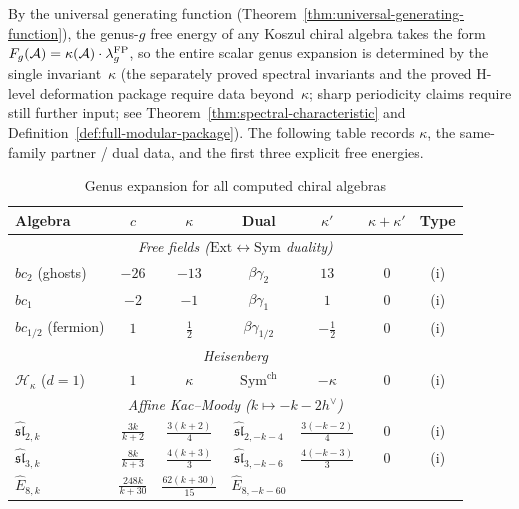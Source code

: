 By the universal generating function
(Theorem~\ref{thm:universal-generating-function}), the genus-$g$
free energy of any Koszul chiral algebra takes the form
$F_g(\mathcal{A}) = \kappa(\mathcal{A}) \cdot \lambda_g^{\mathrm{FP}}$, so the
entire scalar genus expansion is determined by the single
invariant~$\kappa$ (the separately proved spectral invariants and the
proved H-level deformation package require data beyond~$\kappa$; sharp
periodicity claims require still further input; see
Theorem~\ref{thm:spectral-characteristic} and
Definition~\ref{def:full-modular-package}).
The following table records $\kappa$, the same-family partner / dual data, and
the first three explicit free energies.

\begin{table}[ht]
\centering
\caption{Genus expansion for all computed chiral algebras}
\label{tab:genus-expansion-master}
\renewcommand{\arraystretch}{1.5}
{\small
\begin{tabular}{|l|c|c|c|c|c|c|}
\hline
\textbf{Algebra} & $c$ & $\kappa$ &
\textbf{Dual} & $\kappa'$ & $\kappa{+}\kappa'$ &
\textbf{Type} \\
\hline
\multicolumn{7}{|c|}{\textit{Free fields
  ($\mathrm{Ext} \leftrightarrow \mathrm{Sym}$ duality)}} \\
\hline
$bc_2$ (ghosts)
  & $-26$ & $-13$ & $\beta\gamma_2$
  & $13$ & $0$ & (i) \\
\hline
$bc_1$
  & $-2$ & $-1$ & $\beta\gamma_1$
  & $1$ & $0$ & (i) \\
\hline
$bc_{1/2}$ (fermion)
  & $1$ & $\frac{1}{2}$ & $\beta\gamma_{1/2}$
  & $-\frac{1}{2}$ & $0$ & (i) \\
\hline
\multicolumn{7}{|c|}{\textit{Heisenberg}} \\
\hline
$\mathcal{H}_\kappa$ ($d = 1$)
  & $1$ & $\kappa$ & $\mathrm{Sym}^{\mathrm{ch}}$
  & $-\kappa$ & $0$ & (i) \\
\hline
\multicolumn{7}{|c|}{\textit{Affine Kac--Moody
  ($k \mapsto -k - 2h^\vee$)}} \\
\hline
$\widehat{\mathfrak{sl}}_{2,k}$
  & $\frac{3k}{k{+}2}$ & $\frac{3(k{+}2)}{4}$
  & $\widehat{\mathfrak{sl}}_{2,-k-4}$
  & $\frac{3(-k{-}2)}{4}$ & $0$ & (i) \\
\hline
$\widehat{\mathfrak{sl}}_{3,k}$
  & $\frac{8k}{k{+}3}$ & $\frac{4(k{+}3)}{3}$
  & $\widehat{\mathfrak{sl}}_{3,-k-6}$
  & $\frac{4(-k{-}3)}{3}$ & $0$ & (i) \\
\hline
$\widehat{E}_{8,k}$
  & $\frac{248k}{k{+}30}$ & $\frac{62(k{+}30)}{15}$
  & $\widehat{E}_{8,-k-60}$

\end{tabular}}
\end{table}
